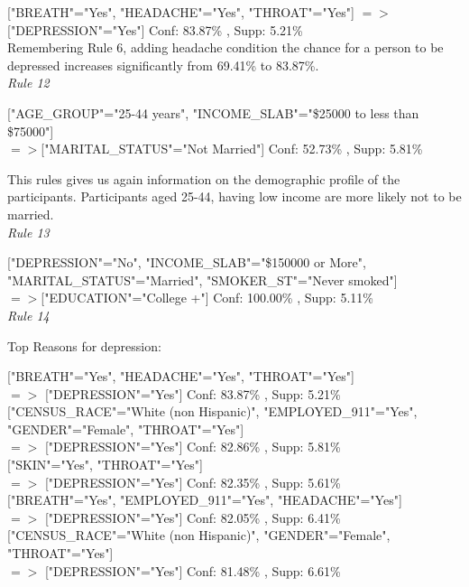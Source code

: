 \documentclass[11pt]{article}
\begin{document}
["BREATH"="Yes", "HEADACHE"="Yes", "THROAT"="Yes"] $=>$ ["DEPRESSION"="Yes"] Conf: 83.87\% , Supp: 5.21\%  \\

Remembering Rule 6, adding headache condition the chance for a person to be depressed increases significantly from 69.41\% to 83.87\%. \\

\textit{Rule 12}

["AGE\_GROUP"="25-44 years", "INCOME\_SLAB"="\$25000 to less than \$75000"] \\
$=>$["MARITAL\_STATUS"="Not Married"] Conf: 52.73\% , Supp: 5.81\% 

This rules gives us again information on the demographic profile of the participants. Participants aged 25-44, having low income are more likely
not to be married.\\

\textit{Rule 13}

["DEPRESSION"="No", "INCOME\_SLAB"="\$150000 or More", "MARITAL\_STATUS"="Married", "SMOKER\_ST"="Never smoked"] \\
$=>$["EDUCATION"="College +"] Conf: 100.00\% , Supp: 5.11\%  \\

\textit{Rule 14}

Top Reasons for depression:

["BREATH"="Yes", "HEADACHE"="Yes", "THROAT"="Yes"]\\
$=>$ ["DEPRESSION"="Yes"] Conf: 83.87\% , Supp: 5.21\% \\

["CENSUS\_RACE"="White (non Hispanic)", "EMPLOYED\_911"="Yes", "GENDER"="Female", "THROAT"="Yes"] \\
 $=>$ ["DEPRESSION"="Yes"] Conf: 82.86\% , Supp: 5.81\%   \\

["SKIN"="Yes", "THROAT"="Yes"] \\
$=>$ ["DEPRESSION"="Yes"] Conf: 82.35\% , Supp: 5.61\%   \\

["BREATH"="Yes", "EMPLOYED\_911"="Yes", "HEADACHE"="Yes"] \\
 $=>$ ["DEPRESSION"="Yes"] Conf: 82.05\% , Supp: 6.41\%  \\

["CENSUS\_RACE"="White (non Hispanic)", "GENDER"="Female", "THROAT"="Yes"] \\
  $=>$ ["DEPRESSION"="Yes"] Conf: 81.48\% , Supp: 6.61\%  \\
\end{document}
